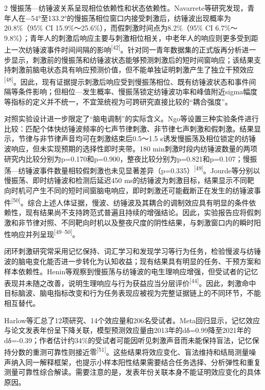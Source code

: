 \documentclass[UTF8,zihao=5,fontset=none]{ctexart}
\newcommand{\hei}{\CJKfamily{hei}}
\newcommand{\leveltwo}[1]{%
  \par\noindent{\hei\fontsize{10.5pt}{12.6pt}\selectfont\mdseries #1\par}}
\newcommand{\refcite}[1]{\nolinebreak[4]\textsuperscript{[#1]}}
\begin{document}
\begin{multicols}{2}
慢振荡—纺锤波关系呈现相位依赖性和状态依赖性。Navarrete等研究发现，青年人在−54°至133.2°的慢振荡相位窗口内接受刺激后，纺锤波出现概率为20.8\%（95\% CI 15.9\%～25.6\%），而假刺激时间点为8.2\%（95\% CI 6.7\%～9.8\%）；青年人的刺激后响应主要与刺激相位相关，中老年人的响应则更多受到距上一次纺锤波事件时间间隔的影响\refcite{42}。针对同一青年数据集的正式版再分析进一步显示，刺激前的慢振荡和纺锤波状态能够预测刺激后的短时间窗响应；该结果支持刺激前脑电状态具有响应预测价值，但不能单独证明刺激产生了独立干预效应\refcite{48}。因此，现有证据提示刺激后响应受到慢振荡相位、既有纺锤波状态和事件间隔等条件影响；但相位—发生概率、慢振荡锁定纺锤波功率和峰值附近sigma幅度等指标的定义并不统一，不宜笼统视为可跨研究直接比较的“耦合强度”。\par

对照实验设计进一步限定了“脑电调制”的实际含义。Ngo等设置三种实验条件进行比较：匹配个体快纺锤波频率的七声节律刺激、非节律七声刺激和假刺激。结果显示，节律与非节律声音均可在刺激结束后0.5～1.5 s诱发慢振荡及相位锁定的纺锤波响应，但未实现预期的选择性即时夹带。180 min刺激时段内纺锤波数量的两项研究内比较分别为p=0.170和p=0.900，整夜比较分别为p=0.821和p=0.107；慢振荡—纺锤波事件数量相较假刺激也未见显著差异（p=0.335）\refcite{49}。Jourde等分别以慢振荡、即时纺锤波和检测后延迟450 ms的纺锤波为刺激目标，结果显示不同靶向时机可产生不同的短时间窗脑电响应，即时刺激还可能截断正在发生的纺锤波事件\refcite{50}。综合上述人体证据，慢波、纺锤波及其耦合的调制效应具有明显的条件依赖性，现有结果尚不支持跨范式普遍且持续的增强结论。因此，实验报告应将假刺激和非节律对照、不同靶向时机以及整夜尺度的阴性结果，与刺激窗口内的瞬时阳性响应并列呈现\refcite{49--50}。\par

\leveltwo{3.3 记忆巩固与认知收益的疗效证据及争议}

闭环刺激研究常采用记忆保持、词汇学习和发现学习等行为任务，检验慢波与纺锤波的脑电变化能否进一步转化为认知收益；现有结果具有明显的任务、干预方案和样本依赖性。Henin等观察到慢振荡与纺锤波的电生理响应增强，但受试者的记忆表现并未随之改善，说明生理响应与行为获益应当分层评价\refcite{44}。因此，刺激命中目标脑波、脑电指标改变和行为任务表现应被视为完整证据链上的不同环节，不能相互替代。\par

Harlow等汇总了12项研究、14个效应量和206名受试者。Meta回归显示，记忆效应与论文发表年份呈下降关联，模型预测效应量由2013年的dδ=0.99降至2021年的dδ=-0.39；作者估计约34\%的受试者可能因听见刺激声音而未能保持盲法，记忆保持分数的重测可靠性则接近零\refcite{51}。这些结果将效应变化、盲法维持和结局测量噪声纳入同一解释框架，也提示小样本阳性结果需要结合任务选择、分析弹性和重复测量可靠性综合解读。需要注意的是，发表年份关联本身不能证明效应变化的具体原因。\par


\end{multicols}
\end{document}
